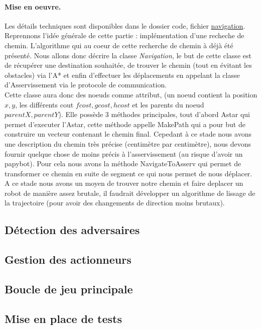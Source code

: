 \documentclass[a4paper,10pt]{report}
\begin{document}
\begin{spacing}{1.5}
\paragraph{Mise en oeuvre.} Les détails techniques sont disponibles dans le
dossier code, fichier
\href{https://github.com/eirbot/eirbot2020-1A/blob/master/code/src/navigation.cpp}{navigation}.
\\ Reprennons l'idée générale de cette partie : implémentation d'une recheche de
chemin. L'algorithme qui au coeur de cette recherche de chemin à déjà été
présenté. Nous allons donc décrire la classe \textit{Navigation}, le but de
cette classe est de récupérer une destination souhaitée, de trouver le chemin
(tout en évitant les obstacles) via l'A* et enfin d'effectuer les déplacements
en appelant la classe d'Asservissement via le protocole de
communication.\\ Cette classe aura donc des noeuds comme attribut, (un noeud
contient la position $x,y$, les différents cout $fcost, gcost, hcost$ et les
parents du noeud $parentX,parentY$). Elle possède 3 méthodes principales, tout
d'abord Astar qui permet d'executer l'Astar, cette méthode appelle MakePath qui
a pour but de construire un vecteur contenant le chemin final. Cepedant à ce
stade nous avons une description du chemin très précise (centimètre par
centimètre), nous devons fournir quelque chose de moins précis à
l'asservissement (au risque d'avoir un papybot). Pour cela nous avons la méthode
NavigateToAsserv qui permet de transformer ce chemin en suite de segment ce qui
nous permet de nous déplacer.\\ A ce stade nous avons un moyen de trouver notre
chemin et faire deplacer un robot de manière assez brutale, il faudrait
développer un algorithme de lissage de la trajectoire (pour avoir des
changements de direction moins brutaux).
\subsection{Détection des adversaires}
\subsection{Gestion des actionneurs}
\subsection{Boucle de jeu principale}
\subsection{Mise en place de tests}

\end{spacing}
\end{document}
